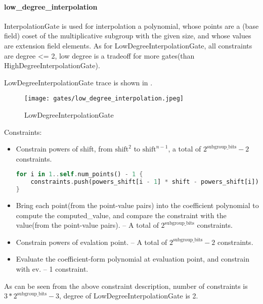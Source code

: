 \paragraph{low\_degree\_interpolation}

InterpolationGate is used for interpolation a polynomial, whose points are a (base field) coset of the multiplicative subgroup 
with the given size, and whose values are extension field elements. As for LowDegreeInterpolationGate,  all constraints are degree <= 2, 
low degree is a tradeoff for more gates(than HighDegreeInterpolationGate).

LowDegreeInterpolationGate trace is shown in .

\begin{figure}[!ht]
    \centering
    \texttt{[image: gates/low\_degree\_interpolation.jpeg]}
    \caption{LowDegreeInterpolationGate}
    \label{fig:low-degree-interpolation}
\end{figure}

Constraints:
\begin{itemize}
    \item Constrain powers of shift, from $\text{shift}^2$ to $\text{shift}^{n-1}$, a total of $2^{\text{subgroup\_bits}}-2$ constraints.
    \begin{lstlisting}[language=rust]
for i in 1..self.num_points() - 1 {
    constraints.push(powers_shift[i - 1] * shift - powers_shift[i]);
}
    \end{lstlisting}
    \item Bring each point(from the point-value pairs) into the coefficient polynomial to compute the computed\_value, 
    and compare the constraint with the value(from the point-value pairs). -- A total of $2^{\text{subgroup\_bits}}$ constraints.
    \item Constrain powers of evalation point. -- A total of $2^{\text{subgroup\_bits}}-2$ constraints.
    \item Evaluate the coefficient-form polynomial at evaluation point, and constrain with ev. -- 1 constraint.
\end{itemize}

As can be seen from the above constraint description, number of constraints is $3*2^{\text{subgroup\_bits}}-3$, degree of LowDegreeInterpolationGate is 2.
